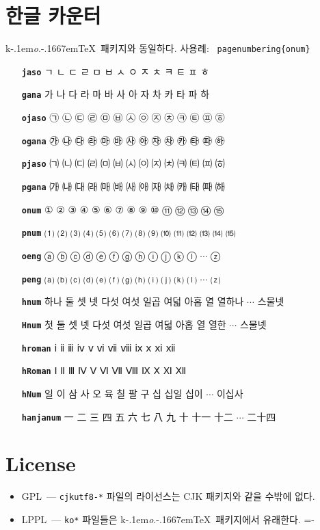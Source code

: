 \documentclass[dvipdfmx,b5paper]{article}
\def\cs#1{\texttt{\color{teal}\char92 #1}}
\def\koTeX{\textsf{k}\kern-.1em\textit{o}.\kern-.1667em\TeX}
\begin{document}
\section{한글 카운터}
\koTeX\ 패키지와 동일하다. 사용례: \cs{pagenumbering\{onum\}}
\begin{itemize}\leftskip=1cm =1em \itemsep=0pt plus0pt
      \def\cs#1{\texttt{\bfseries #1}}
  \item[\cs{jaso}] ㄱ ㄴ ㄷ ㄹ ㅁ ㅂ ㅅ ㅇ ㅈ ㅊ ㅋ ㅌ ㅍ ㅎ
  \item[\cs{gana}] 가 나 다 라 마 바 사 아 자 차 카 타 파 하
  \item[\cs{ojaso}] ㉠ ㉡ ㉢ ㉣ ㉤ ㉥ ㉦ ㉧ ㉨ ㉩ ㉪ ㉫ ㉬ ㉭
  \item[\cs{ogana}] ㉮ ㉯ ㉰ ㉱ ㉲ ㉳ ㉴ ㉵ ㉶ ㉷ ㉸ ㉹ ㉺ ㉻
  \item[\cs{pjaso}] ㈀ ㈁ ㈂ ㈃ ㈄ ㈅ ㈆ ㈇ ㈈ ㈉ ㈊ ㈋ ㈌ ㈍
  \item[\cs{pgana}] ㈎ ㈏ ㈐ ㈑ ㈒ ㈓ ㈔ ㈕ ㈖ ㈗ ㈘ ㈙ ㈚ ㈛
  \item[\cs{onum}]  ① ② ③ ④ ⑤ ⑥ ⑦ ⑧ ⑨ ⑩ ⑪ ⑫ ⑬ ⑭ ⑮
  \item[\cs{pnum}] ⑴ ⑵ ⑶ ⑷ ⑸ ⑹ ⑺ ⑻ ⑼ ⑽ ⑾ ⑿ ⒀ ⒁ ⒂
  \item[\cs{oeng}] ⓐ ⓑ ⓒ ⓓ ⓔ ⓕ ⓖ ⓗ ⓘ ⓙ ⓚ ⓛ $\cdots$ ⓩ
  \item[\cs{peng}] ⒜ ⒝ ⒞ ⒟ ⒠ ⒡ ⒢ ⒣ ⒤ ⒥ ⒦ ⒧ $\cdots$ ⒵
  \item[\cs{hnum}] 하나 둘 셋 넷 다섯 여섯 일곱 여덟 아홉 열 열하나 $\cdots$ 스물넷
  \item[\cs{Hnum}] 첫 둘 셋 넷 다섯 여섯 일곱 여덟 아홉 열 열한 $\cdots$ 스물넷
  \item[\cs{hroman}] ⅰ ⅱ ⅲ ⅳ ⅴ ⅵ ⅶ ⅷ ⅸ ⅹ ⅺ ⅻ
  \item[\cs{hRoman}] Ⅰ Ⅱ Ⅲ Ⅳ Ⅴ Ⅵ Ⅶ Ⅷ Ⅸ Ⅹ Ⅺ Ⅻ
  \item[\cs{hNum}] 일 이 삼 사 오 육 칠 팔 구 십 십일 십이 $\cdots$ 이십사
  \item[\cs{hanjanum}] 一 二 三 四 五 六 七 八 九 十 十一 十二 $\cdots$ 二十四
\end{itemize}

\section{License}
\begin{itemize}
  \item GPL~--- \verb|cjkutf8-*| 파일의 라이선스는 CJK 패키지와
    같을 수밖에 없다.
  \item LPPL~--- \verb|ko*| 파일들은 \koTeX\ 패키지에서 유래한다.
  \hfill \fboxsep=-\fboxrule
\end{itemize}
\end{document}
